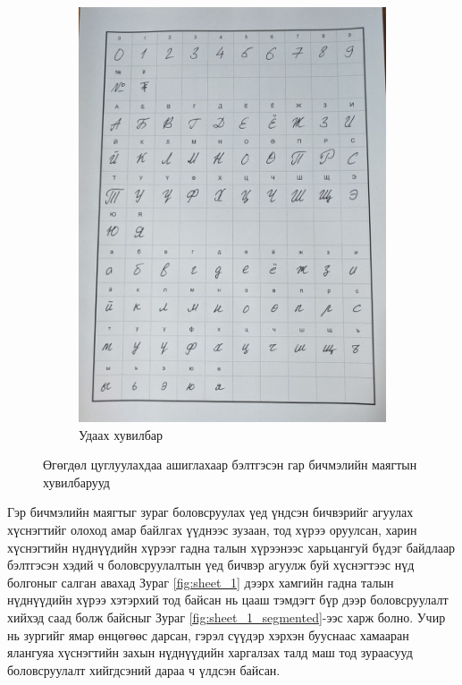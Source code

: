\begin{figure}[ht]
\begin{subfigure}{0.52\textwidth}
		\includegraphics[width=0.9\linewidth]{images/sheet_2}
		\caption{Удаах хувилбар}
		\label{fig:sheet_2}
	\end{subfigure}
	\caption{Өгөгдөл цуглуулахдаа ашиглахаар бэлтгэсэн гар бичмэлийн маягтын хувилбарууд}
	\label{fig:sheets}
\end{figure}


Гэр бичмэлийн маягтыг зураг боловсруулах үед үндсэн бичвэрийг агуулах хүснэгтийг олоход амар байлгах үүднээс зузаан, тод хүрээ оруулсан, харин хүснэгтийн нүднүүдийн хүрээг гадна талын хүрээнээс харьцангуй бүдэг байдлаар бэлтгэсэн хэдий ч боловсруулалтын үед бичвэр агуулж буй хүснэгтээс нүд болгоныг салган авахад Зураг \ref{fig:sheet_1} дээрх хамгийн гадна талын нүднүүдийн хүрээ хэтэрхий тод байсан нь цааш тэмдэгт бүр дээр боловсруулалт хийхэд саад болж байсныг Зураг \ref{fig:sheet_1_segmented}-ээс харж болно. Учир нь зургийг ямар өнцөгөөс дарсан, гэрэл сүүдэр хэрхэн бууснаас хамааран ялангуяа хүснэгтийн захын нүднүүдийн харгалзах талд маш тод зураасууд боловсруулалт хийгдсэний дараа ч үлдсэн байсан.

